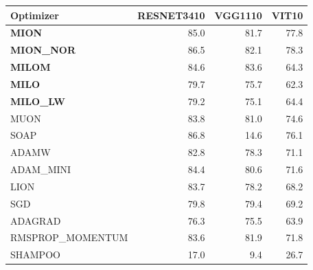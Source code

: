 \begin{tabular}{lrrr}
\toprule
Optimizer & RESNET3410 & VGG1110 & VIT10 \\
\midrule
\textbf{MION} & 85.0 & 81.7 & 77.8 \\
\textbf{MION\_NOR} & 86.5 & 82.1 & 78.3 \\
\textbf{MILOM} & 84.6 & 83.6 & 64.3 \\
\textbf{MILO} & 79.7 & 75.7 & 62.3 \\
\textbf{MILO\_LW} & 79.2 & 75.1 & 64.4 \\
MUON & 83.8 & 81.0 & 74.6 \\
SOAP & 86.8 & 14.6 & 76.1 \\
ADAMW & 82.8 & 78.3 & 71.1 \\
ADAM\_MINI & 84.4 & 80.6 & 71.6 \\
LION & 83.7 & 78.2 & 68.2 \\
SGD & 79.8 & 79.4 & 69.2 \\
ADAGRAD & 76.3 & 75.5 & 63.9 \\
RMSPROP\_MOMENTUM & 83.6 & 81.9 & 71.8 \\
SHAMPOO & 17.0 & 9.4 & 26.7 \\
\bottomrule
\end{tabular}